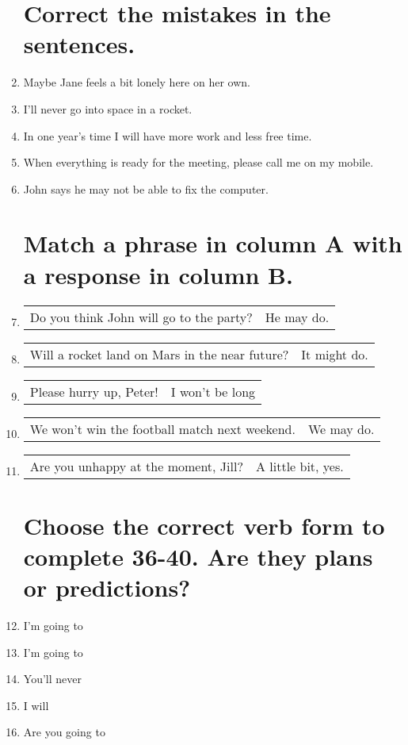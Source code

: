 \documentclass[a5paper, 10pt, final]{extreport}
\begin{document}
\begin{enumerate}
\section{Correct the mistakes in the sentences.}
\item Maybe Jane feels a bit lonely here on her own.
\item I'll never go into space in a rocket.
\item In one year's time I will have more work and less free time.
\item When everything is ready for the meeting, please call me on my mobile.
\item John says he may not be able to fix the computer.




\section{Match a phrase in column A with a response in column B.}
\item 
\begin{tabular}{ p{6cm} | p{3cm} }
Do you think John will go to the party? & He may do.\\
\end{tabular}
\item
\begin{tabular}{ p{6cm} | p{3cm} }
Will a rocket land on Mars in the near future? & It might do.\\
\end{tabular}
\item
\begin{tabular}{ p{6cm} | p{3cm} }
Please hurry up, Peter! & I won't be long\\
\end{tabular}
\item
\begin{tabular}{ p{6cm} | p{3cm} }
We won't win the football match next weekend. & We may do.\\
\end{tabular}
\item
\begin{tabular}{ p{6cm} | p{3cm} }
Are you unhappy at the moment, Jill? & A little bit, yes.\\
\end{tabular}

\section{Choose the correct verb form to complete 36-40. Are they plans or predictions?}
\item I'm going to
\item I'm going to
\item You'll never
\item I will
\item Are you going to


\end{enumerate}
\end{document}
